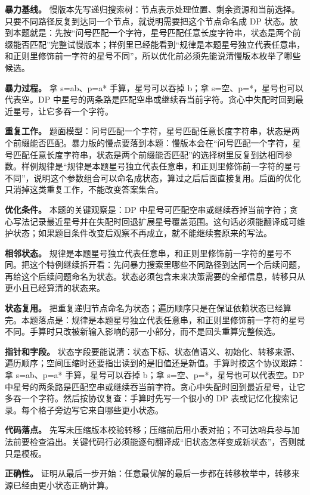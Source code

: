 \textbf{暴力基线。} 慢版本先写递归搜索树：节点表示处理位置、剩余资源和当前选择。只要不同路径反复到达同一个节点，就说明需要把这个节点命名成 DP 状态。放到本题就是：先按“问号匹配一个字符，星号匹配任意长度字符串，状态是两个前缀能否匹配”完整试慢版本；样例里已经能看到“规律是本题星号独立代表任意串，和正则里修饰前一字符的星号不同”，所以优化前必须先能说清慢版本枚举了哪些候选。

\textbf{暴力过程。} 拿 s=ab、p=a* 手算，星号可以吞掉 b；拿 s=空、p=*，星号也可以代表空。DP 中星号的两条路是匹配空串或继续吞当前字符。贪心中失配时回到最近星号，让它多吞一个字符。

\textbf{重复工作。} 题面模型：问号匹配一个字符，星号匹配任意长度字符串，状态是两个前缀能否匹配。暴力版的慢点要落到本题：慢版本会在“问号匹配一个字符，星号匹配任意长度字符串，状态是两个前缀能否匹配”的选择树里反复到达相同参数。样例规律是“规律是本题星号独立代表任意串，和正则里修饰前一字符的星号不同”，说明这个参数组合可以命名成状态，算过之后后面直接复用。后面的优化只消掉这类重复工作，不能改变答案集合。

\textbf{优化条件。} 本题的关键观察是：DP 中星号可匹配空串或继续吞掉当前字符；贪心写法记录最近星号并在失配时回退扩展星号覆盖范围。这句话必须能翻译成可维护状态；如果题目条件改变后观察不再成立，就不能继续套原来的写法。

\textbf{相邻状态。} 规律是本题星号独立代表任意串，和正则里修饰前一字符的星号不同。把这个特例继续拆开看：先问暴力搜索里哪些不同路径到达同一个后续问题，再给这个后续问题命名为状态。状态必须包含未来决策需要的全部信息，转移只从更小且已经算清的状态来。

\textbf{状态复用。} 把重复递归节点命名为状态；遍历顺序只是在保证依赖状态已经算完。本题落点是：规律是本题星号独立代表任意串，和正则里修饰前一字符的星号不同。手算时只改被新输入影响的那一小部分，而不是回头重算完整候选。

\textbf{指针和字段。} 状态字段要能说清：状态下标、状态值语义、初始化、转移来源、遍历顺序；空间压缩时还要指出读到的是旧值还是新值。手算时按这个协议跟踪：拿 s=ab、p=a* 手算，星号可以吞掉 b；拿 s=空、p=*，星号也可以代表空。DP 中星号的两条路是匹配空串或继续吞当前字符。贪心中失配时回到最近星号，让它多吞一个字符。然后按协议复查：手算时先写一个很小的 DP 表或记忆化搜索记录。每个格子旁边写它来自哪些更小状态。

\textbf{代码落点。} 先写未压缩版本校验转移；压缩前后用小表对拍；不可达哨兵参与加法前要检查溢出。关键代码行必须能逐句翻译成“旧状态怎样变成新状态”，否则就只是模板。

\textbf{正确性。} 证明从最后一步开始：任意最优解的最后一步都在转移枚举中，转移来源已经由更小状态正确计算。

